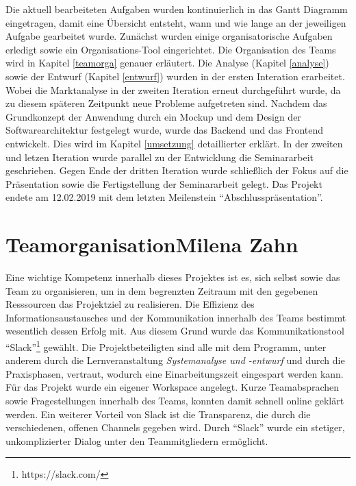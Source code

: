 	Die aktuell bearbeiteten Aufgaben wurden kontinuierlich in das Gantt Diagramm eingetragen, damit eine Übersicht entsteht, wann und wie lange an der jeweiligen Aufgabe gearbeitet wurde. Zunächst wurden einige organisatorische Aufgaben erledigt sowie ein Organisations-Tool eingerichtet. Die Organisation des Teams wird in Kapitel \vref{teamorga} genauer erläutert. Die Analyse (Kapitel \vref{analyse}) sowie der Entwurf (Kapitel \vref{entwurf}) wurden in der ersten Interation erarbeitet. Wobei die Marktanalyse in der zweiten Iteration erneut durchgeführt wurde, da zu diesem späteren Zeitpunkt neue Probleme aufgetreten sind. Nachdem das Grundkonzept der Anwendung durch ein Mockup und dem Design der Softwarearchitektur festgelegt wurde, wurde das Backend und das Frontend entwickelt. Dies wird im Kapitel \vref{umsetzung} detaillierter erklärt. In der zweiten und letzen Iteration wurde parallel zu der Entwicklung die Seminararbeit geschrieben. Gegen Ende der dritten Iteration wurde schließlich der Fokus auf die Präsentation sowie die Fertigstellung der Seminararbeit gelegt. Das Projekt endete am 12.02.2019 mit dem letzten Meilenstein \enquote{Abschlusspräsentation}.
	
	
	\section[Teamorganisation]{Teamorganisation{\hfill \normalsize Milena Zahn}} \label{teamorga}
	Eine wichtige Kompetenz innerhalb dieses Projektes ist es, sich selbst sowie das Team zu organisieren, um in dem begrenzten Zeitraum mit den gegebenen Resssourcen das Projektziel zu realisieren. Die Effizienz des Informationsaustausches und der Kommunikation innerhalb des Teams bestimmt wesentlich dessen Erfolg mit. Aus diesem Grund wurde das Kommunikationstool \enquote{Slack}\footnote{https://slack.com/} gewählt. Die Projektbeteiligten sind alle mit dem Programm, unter anderem durch die Lernveranstaltung \textit{Systemanalyse und -entwurf} und durch die Praxisphasen, vertraut, wodurch eine Einarbeitungszeit eingespart werden kann. Für das Projekt wurde ein eigener Workspace angelegt. Kurze Teamabsprachen sowie Fragestellungen innerhalb des Teams, konnten damit schnell online geklärt werden. Ein weiterer Vorteil von Slack ist die Transparenz, die durch die verschiedenen, offenen Channels gegeben wird. Durch \enquote{Slack} wurde ein stetiger, unkomplizierter Dialog unter den Teammitgliedern ermöglicht.
	